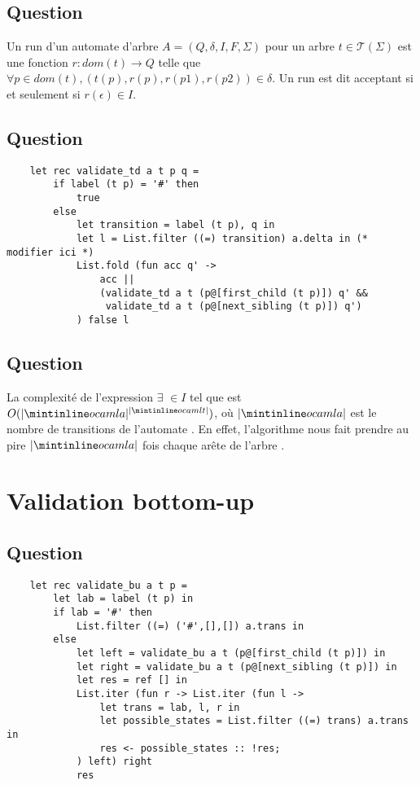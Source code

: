 \documentclass[twoside,12pt]{article}
\begin{document}
\subsection{Question}

Un run d'un automate d'arbre $A = (Q, \delta, I, F, \Sigma)$
pour un arbre $t \in {\mathcal{T}}(\Sigma)$
est une fonction $r : dom(t) \to Q$
telle que $\forall p \in dom(t), (t(p), r(p), r(p1),r(p2)) \in \delta$.
Un run est dit acceptant si et seulement si $r (\epsilon) \in I$.

\subsection{Question}

  \begin{verbatim}
    let rec validate_td a t p q =
        if label (t p) = '#' then
            true
        else
            let transition = label (t p), q in
            let l = List.filter ((=) transition) a.delta in (* modifier ici *)
            List.fold (fun acc q' ->
                acc ||
                (validate_td a t (p@[first_child (t p)]) q' &&
                 validate_td a t (p@[next_sibling (t p)]) q')
            ) false l
   \end{verbatim}

\subsection{Question}

La complexité de l'expression
$\exists$  $\in I$ tel que 
est $O(|\ocaml{a}|^{|\ocaml{t}|})$, où $|\ocaml{a}|$ est le nombre de
transitions de l'automate . En effet, l'algorithme
nous fait prendre au pire $|\ocaml{a}|$ fois chaque arête de l'arbre .


\section{Validation bottom-up}

\subsection{Question}
  \begin{verbatim}
    let rec validate_bu a t p =
        let lab = label (t p) in
        if lab = '#' then
            List.filter ((=) ('#',[],[]) a.trans in
        else
            let left = validate_bu a t (p@[first_child (t p)]) in
            let right = validate_bu a t (p@[next_sibling (t p)]) in
            let res = ref [] in
            List.iter (fun r -> List.iter (fun l ->
                let trans = lab, l, r in
                let possible_states = List.filter ((=) trans) a.trans in
                res <- possible_states :: !res;
            ) left) right
            res
   \end{verbatim}
\end{document}
